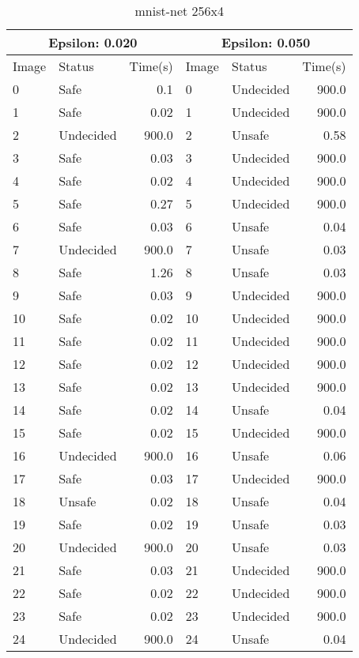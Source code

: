 \begin{table}[!ht]
  \centering
  \caption{mnist-net 256x4}
  \footnotesize
  \begin{tabular}{|llr|llr|}
    \toprule
    \multicolumn{3}{|c|}{Epsilon: 0.020} & \multicolumn{3}{|c|}{Epsilon: 0.050} \\
    \midrule
    Image & Status & Time(s) &Image & Status & Time(s)\\ 
    \midrule
    0 & Safe & 0.1 &    0 & Undecided & 900.0\\ 
    1 & Safe & 0.02 &    1 & Undecided & 900.0\\ 
    2 & Undecided & 900.0 &    2 & Unsafe & 0.58\\ 
    3 & Safe & 0.03 &    3 & Undecided & 900.0\\ 
    4 & Safe & 0.02 &    4 & Undecided & 900.0\\ 
    5 & Safe & 0.27 &    5 & Undecided & 900.0\\ 
    6 & Safe & 0.03 &    6 & Unsafe & 0.04\\ 
    7 & Undecided & 900.0 &    7 & Unsafe & 0.03\\ 
    8 & Safe & 1.26 &    8 & Unsafe & 0.03\\ 
    9 & Safe & 0.03 &    9 & Undecided & 900.0\\ 
    10 & Safe & 0.02 &    10 & Undecided & 900.0\\ 
    11 & Safe & 0.02 &    11 & Undecided & 900.0\\ 
    12 & Safe & 0.02 &    12 & Undecided & 900.0\\ 
    13 & Safe & 0.02 &    13 & Undecided & 900.0\\ 
    14 & Safe & 0.02 &    14 & Unsafe & 0.04\\ 
    15 & Safe & 0.02 &    15 & Undecided & 900.0\\ 
    16 & Undecided & 900.0 &    16 & Unsafe & 0.06\\ 
    17 & Safe & 0.03 &    17 & Undecided & 900.0\\ 
    18 & Unsafe & 0.02 &    18 & Unsafe & 0.04\\ 
    19 & Safe & 0.02 &    19 & Unsafe & 0.03\\ 
    20 & Undecided & 900.0 &    20 & Unsafe & 0.03\\ 
    21 & Safe & 0.03 &    21 & Undecided & 900.0\\ 
    22 & Safe & 0.02 &    22 & Undecided & 900.0\\ 
    23 & Safe & 0.02 &    23 & Undecided & 900.0\\ 
    24 & Undecided & 900.0 &    24 & Unsafe & 0.04\\ 
    \bottomrule
  \end{tabular}
\end{table}

